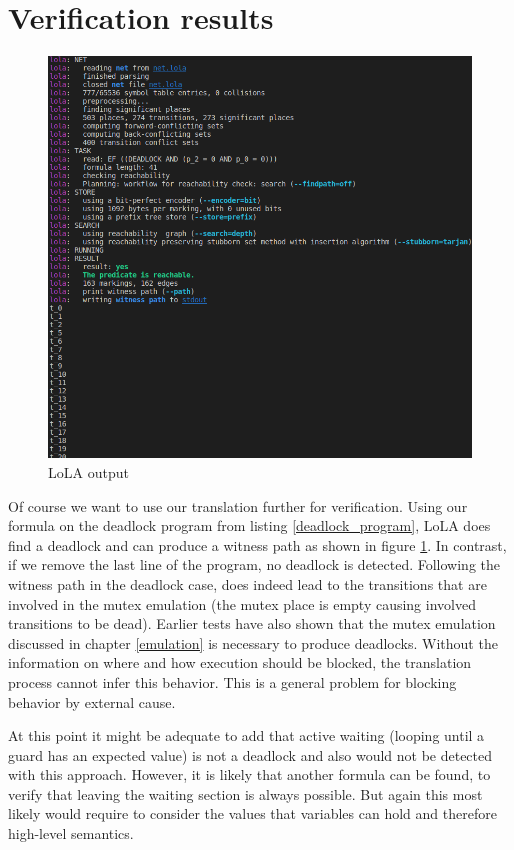 \section{Verification results}
\begin{figure}
  \centering
  \includegraphics[width=1\textwidth]{./pictures/lola_output.png}
  \caption{LoLA output}
  \label{lola_output}
\end{figure}
Of course we want to use our translation further for verification.
Using our formula on the deadlock program from listing \ref{deadlock_program}, LoLA does find a deadlock and can produce a witness path as shown in figure \ref{lola_output}.
In contrast, if we remove the last line of the program, no deadlock is detected.
Following the witness path in the deadlock case, does indeed lead to the transitions that are involved in the mutex emulation (the mutex place is empty causing involved transitions to be dead).
Earlier tests have also shown that the mutex emulation discussed in chapter \ref{emulation} is necessary to produce deadlocks.
Without the information on where and how execution should be blocked, the translation process cannot infer this behavior.
This is a general problem for blocking behavior by external cause.

At this point it might be adequate to add that active waiting (looping until a guard has an expected value) is not a deadlock and also would not be detected with this approach.
However, it is likely that another formula can be found, to verify that leaving the waiting section is always possible.
But again this most likely would require to consider the values that variables can hold and therefore high-level semantics.

